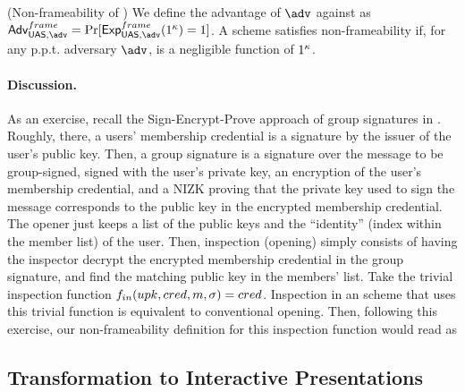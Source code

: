 \begin{definition}{(Non-frameability of \GSAC)}
  We define the advantage \AdvNonframe of $\adv$ against \ExpNonframe as
  $\AdvNonframe=\Pr\lbrack\ExpNonframe(1^\secpar)=1\rbrack$.
  A \GSAC scheme satisfies non-frameability if, for any p.p.t. adversary $\adv$,
  \AdvNonframe is a negligible function of $1^\kappa$.
\end{definition}

\paragraph{Discussion.} %


As an exercise, recall the Sign-Encrypt-Prove approach of group signatures in
\cite{bsz05}. Roughly, there, a users' membership credential is a signature by
the issuer of the user's public key. Then, a group signature is a signature
over the message to be group-signed, signed with the user's private key, an
encryption of the user's membership credential, and a NIZK proving that the
private key used to sign the message corresponds to the public key in the
encrypted membership credential. The opener just keeps a list of the public
keys and the ``identity'' (index within the member list) of the user. Then,
inspection (opening) simply consists of having the inspector decrypt the
encrypted membership credential in the group signature, and find the matching
public key in the members' list. Take the trivial inspection function
$f_{in}(upk,cred,m,\sigma) = cred$. Inspection in an \UAS scheme that uses
this trivial \finsp function is equivalent to conventional opening. Then,
following this exercise, our non-frameability definition for this inspection
function would read as 

\subsection{Transformation to Interactive Presentations}
\label{ssec:interactivetransform}



